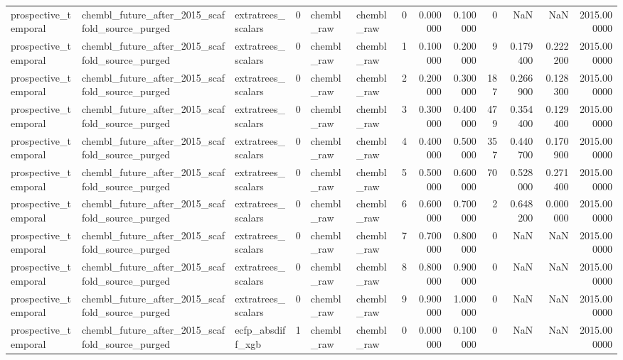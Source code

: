 \begin{longtable}{lllrllrrrrrrr}
prospective\_temporal & chembl\_future\_after\_2015\_scaffold\_source\_purged & extratrees\_scalars & 0 & chembl\_raw & chembl\_raw & 0 & 0.000000 & 0.100000 & 0 & NaN & NaN & 2015.000000 \\
prospective\_temporal & chembl\_future\_after\_2015\_scaffold\_source\_purged & extratrees\_scalars & 0 & chembl\_raw & chembl\_raw & 1 & 0.100000 & 0.200000 & 9 & 0.179400 & 0.222200 & 2015.000000 \\
prospective\_temporal & chembl\_future\_after\_2015\_scaffold\_source\_purged & extratrees\_scalars & 0 & chembl\_raw & chembl\_raw & 2 & 0.200000 & 0.300000 & 187 & 0.266900 & 0.128300 & 2015.000000 \\
prospective\_temporal & chembl\_future\_after\_2015\_scaffold\_source\_purged & extratrees\_scalars & 0 & chembl\_raw & chembl\_raw & 3 & 0.300000 & 0.400000 & 479 & 0.354400 & 0.129400 & 2015.000000 \\
prospective\_temporal & chembl\_future\_after\_2015\_scaffold\_source\_purged & extratrees\_scalars & 0 & chembl\_raw & chembl\_raw & 4 & 0.400000 & 0.500000 & 357 & 0.440700 & 0.170900 & 2015.000000 \\
prospective\_temporal & chembl\_future\_after\_2015\_scaffold\_source\_purged & extratrees\_scalars & 0 & chembl\_raw & chembl\_raw & 5 & 0.500000 & 0.600000 & 70 & 0.528000 & 0.271400 & 2015.000000 \\
prospective\_temporal & chembl\_future\_after\_2015\_scaffold\_source\_purged & extratrees\_scalars & 0 & chembl\_raw & chembl\_raw & 6 & 0.600000 & 0.700000 & 2 & 0.648200 & 0.000000 & 2015.000000 \\
prospective\_temporal & chembl\_future\_after\_2015\_scaffold\_source\_purged & extratrees\_scalars & 0 & chembl\_raw & chembl\_raw & 7 & 0.700000 & 0.800000 & 0 & NaN & NaN & 2015.000000 \\
prospective\_temporal & chembl\_future\_after\_2015\_scaffold\_source\_purged & extratrees\_scalars & 0 & chembl\_raw & chembl\_raw & 8 & 0.800000 & 0.900000 & 0 & NaN & NaN & 2015.000000 \\
prospective\_temporal & chembl\_future\_after\_2015\_scaffold\_source\_purged & extratrees\_scalars & 0 & chembl\_raw & chembl\_raw & 9 & 0.900000 & 1.000000 & 0 & NaN & NaN & 2015.000000 \\
prospective\_temporal & chembl\_future\_after\_2015\_scaffold\_source\_purged & ecfp\_absdiff\_xgb & 1 & chembl\_raw & chembl\_raw & 0 & 0.000000 & 0.100000 & 0 & NaN & NaN & 2015.000000 \\

\end{longtable}
